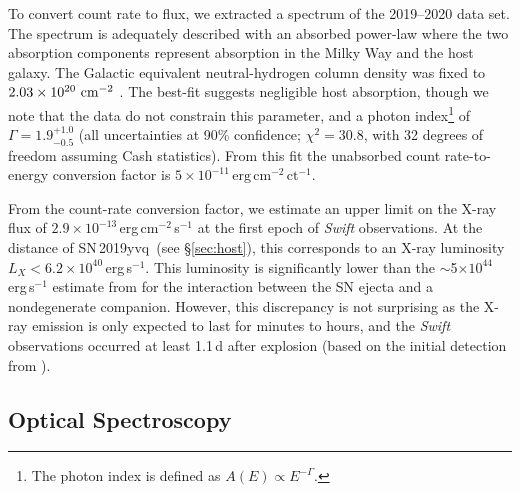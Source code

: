 \documentclass[twocolumn]{aastex63}
\newcommand{\sn}{SN\,2019yvq}
\begin{document}
To convert count rate to flux, we extracted a spectrum of the 2019--2020 data
set. The spectrum is adequately described with an absorbed power-law where the
two absorption components represent absorption in the Milky Way and the host
galaxy. The Galactic equivalent neutral-hydrogen column density was fixed to
$2.03\times10^{20}~{\rm cm}^{-2}$ \citep{HI4PI2016a}. The best-fit suggests
negligible host absorption, though we note that the data do not constrain this
parameter, and a photon index\footnote{The photon index is defined as $A(E)
\propto E^{-\Gamma}$.} of $\Gamma = 1.9^{+1.0}_{-0.5}$ (all uncertainties at
90\% confidence; $\chi^2=30.8$, with 32 degrees of freedom assuming Cash
statistics). From this fit the unabsorbed count rate-to-energy conversion
factor is $5\times10^{-11}\,\mathrm{erg\,cm}^{-2}\,\mathrm{ct}^{-1}$.

From the count-rate conversion factor, we estimate an upper limit on the X-ray
flux of $2.9 \times 10^{-13}$\,erg\,cm$^{-2}$\,s$^{-1}$ at the first epoch of
\textit{Swift} observations. At the distance of \sn\ (see \S\ref{sec:host}),
this corresponds to an X-ray luminosity $L_X < 6.2 \times
10^{40}$\,erg\,s$^{-1}$. This luminosity is significantly lower than the
$\sim$5$\times 10^{44}$\,erg\,s$^{-1}$ estimate from \citet{Kasen10a} for the
interaction between the SN ejecta and a nondegenerate companion. However, this
discrepancy is not surprising as the X-ray emission is only expected to last
for minutes to hours, and the \textit{Swift} observations occurred at least
1.1\,d after explosion (based on the initial detection from
\citealt{Itagaki19}).

\subsection{Optical Spectroscopy}
\end{document}
